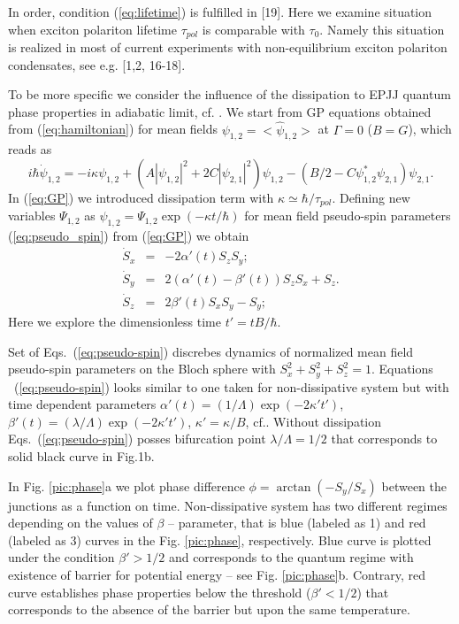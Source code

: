 \documentclass[aps, pre, preprint, groupedaddress, superscriptaddress, showkeys, showpacs] {revtex4-1}
\begin{document}
In order,  condition (\ref{eq:lifetime}) is fulfilled in [19]. Here we examine situation when exciton polariton lifetime $\tau_{pol}$ is comparable with $\tau_{0}$. Namely  this situation is realized in most of current experiments with non-equilibrium exciton polariton condensates, see e.g. [1,2, 16-18].  

To be more specific we consider the influence of the dissipation to  EPJJ quantum phase properties in adiabatic limit, cf. \cite{Sols}.
We start from GP equations obtained from  (\ref{eq:hamiltonian}) for mean fields $\psi_{1,2}=<\hat\psi_{1,2}>$  at $\Gamma = 0$ ($B = G$),  which reads as 
\begin{equation}
i \hbar \dot{\psi}_{1,2} = -i \kappa \psi_{1,2} + (A|\psi_{1,2}|^2 + 2C |\psi_{2,1}|^2) \psi_{1,2} - (B/2 - C \psi_{1,2}^* \psi_{2,1}) \psi_{2,1}. 
\label{eq:GP}
\end{equation}
In (\ref{eq:GP}) we introduced dissipation  term with $\kappa \simeq \hbar/\tau_{pol}$.
Defining new variables $\Psi_{1,2}$ as  $\psi_{1,2} = \Psi_{1,2} \exp(-\kappa t / \hbar)$ for mean field pseudo-spin  parameters (\eqref{eq:pseudo_spin}) from (\ref{eq:GP}) we obtain
%
%
% 
\begin{equation}
\begin{array}{lcl}
\dot{S}_x & = & -2 \alpha'(t) S_z S_y; \\
\dot{S}_y & = & 2(\alpha'(t) - \beta'(t)) S_z S_x + S_z. \\
\dot{S}_z & = &  2 \beta'(t) S_x S_y - S_y;
\end{array}
\label{eq:pseudo-spin}
\end{equation}
%
Here we explore the dimensionless time $t' = t B / \hbar$.

Set of Eqs.\ ({\ref{eq:pseudo-spin}}) discrebes dynamics of normalized mean field pseudo-spin parameters on the Bloch sphere with $S_x^2 + S_y^2 + S_z^2 = 1$.
Equations  \ ({\ref{eq:pseudo-spin}}) looks similar to one taken for non-dissipative system but with time dependent parameters $\alpha'(t) = (1/ \Lambda) \exp(-2 \kappa' t')$, $\beta'(t) = (\lambda / \Lambda) \exp(-2 \kappa' t')$, $\kappa' = \kappa / B$, cf.\cite{Sedov}. Without dissipation Eqs.\ ({\ref{eq:pseudo-spin}}) posses  bifurcation point $\lambda / \Lambda= 1 / 2$ that corresponds to solid black curve in Fig.1b. 

In Fig. \ref{pic:phase}a we plot phase difference $ \phi = \arctan(-S_y / S_x)$ between the junctions as a function on time.  Non-dissipative system has two different regimes depending on the values of  $\beta$ -- parameter, that is blue  (labeled as 1) and red (labeled as 3) curves in the Fig. \ref{pic:phase}, respectively. Blue  curve is plotted under the condition $\beta' > 1/2$ and  corresponds to the quantum regime with existence of barrier for potential energy -- see Fig. \ref{pic:phase}b. Contrary,  red curve establishes phase properties below the threshold ($\beta' <1/2$) that corresponds to the absence of the barrier but upon the same temperature. 
\end{document}
